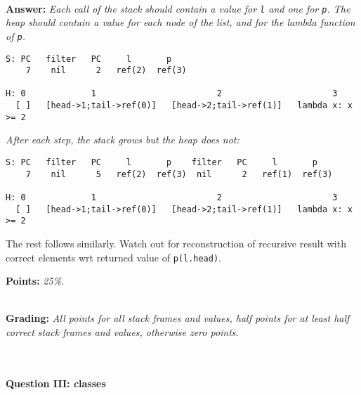 \ \\ 

\textbf{Answer:} \textit{Each call of the stack should contain a value for \texttt{l} and one for \texttt{p}. The heap should contain a value for each node of the list, and for the lambda function of \texttt{p}.}

\begin{lstlisting}
S: PC   filter   PC     l       p
    7    nil      2   ref(2)  ref(3)
    
H: 0             1                        2                      3
  [ ]   [head->1;tail->ref(0)]   [head->2;tail->ref(1)]   lambda x: x >= 2
\end{lstlisting}

\textit{After each step, the stack grows but the heap does not:}

\begin{lstlisting}
S: PC   filter   PC     l       p    filter   PC     l       p
    7    nil      5   ref(2)  ref(3)  nil      2   ref(1)  ref(3)
    
H: 0             1                        2                      3
  [ ]   [head->1;tail->ref(0)]   [head->2;tail->ref(1)]   lambda x: x >= 2
\end{lstlisting}

The rest follows similarly. Watch out for reconstruction of recursive result with correct elements wrt returned value of \texttt{p(l.head)}.

\textbf{Points:} \textit{25\%.}

\ \\ 

\textbf{Grading:} \textit{All points for all stack frames and values, half points for at least half correct stack frames and values, otherwise zero points.}

\ \\ 

\paragraph{Question III: classes} \ \\

